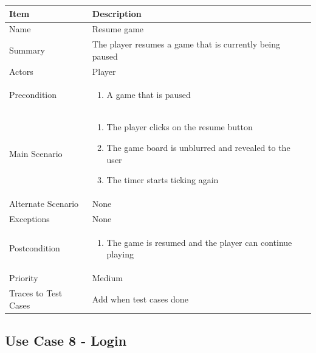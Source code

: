\documentclass[12pt]{article}
\begin{document}
\begin{center}
\setlength{\tabcolsep}{18pt}
\renewcommand{\arraystretch}{1.3}
\begin{tabular}{ |p{3.4cm}|p{10cm}| }
    \hline
    \textbf{Item} & \textbf{Description} \\
    \hline
    Name & Resume game \\
    \hline
    Summary & The player resumes a game that is currently being paused \\
    \hline
    Actors & Player \\
    \hline
    Precondition & 
    \vspace*{-0.1in}
    \begin{enumerate}[leftmargin=0.2in]
        \item A game that is paused
    \end{enumerate}  \\
    \hline
    Main Scenario &     
    \vspace*{-0.1in}
    \begin{enumerate}[leftmargin=0.2in]
        \item The player clicks on the resume button
        \item The game board is unblurred and revealed to the user
        \item The timer starts ticking again
    \end{enumerate}  \\
    \hline
    Alternate Scenario & None \\
    \hline
    Exceptions & None \\
    \hline
    Postcondition & \vspace*{-0.1in}
    \begin{enumerate}[leftmargin=0.2in]
        \item The game is resumed and the player can continue playing
    \end{enumerate}  \\
    \hline
    Priority & Medium  \\
    \hline
    Traces to Test Cases & Add when test cases done  \\
    \hline
\end{tabular}
\end{center}

\newpage


\subsection{Use Case 8 - Login}
\end{document}
